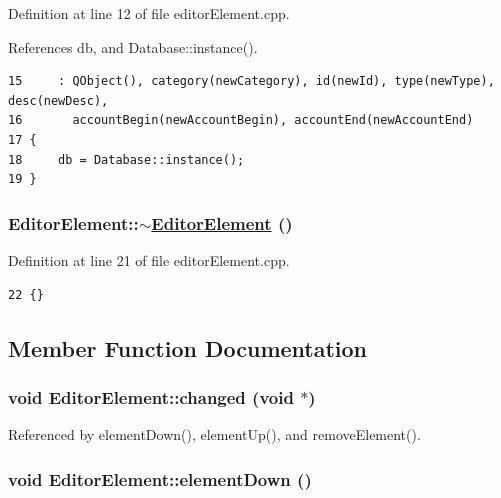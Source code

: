 Definition at line 12 of file editor\-Element.cpp.

References db, and Database::instance().

\footnotesize\begin{verbatim}15     : QObject(), category(newCategory), id(newId), type(newType), desc(newDesc),
16       accountBegin(newAccountBegin), accountEnd(newAccountEnd)
17 {
18     db = Database::instance();
19 }
\end{verbatim}\normalsize 


\hypertarget{classEditorElement_a1}{
\subsubsection[$\sim$EditorElement]{\setlength{\rightskip}{0pt plus 5cm}Editor\-Element::$\sim$\hyperlink{classEditorElement}{Editor\-Element} ()}}
\label{classEditorElement_a1}


Definition at line 21 of file editor\-Element.cpp.

\footnotesize\begin{verbatim}22 {}
\end{verbatim}\normalsize 




\subsection{Member Function Documentation}
\hypertarget{classEditorElement_l0}{
\subsubsection[changed]{\setlength{\rightskip}{0pt plus 5cm}void Editor\-Element::changed (void $\ast$)}}
\label{classEditorElement_l0}




Referenced by element\-Down(), element\-Up(), and remove\-Element().\hypertarget{classEditorElement_k1}{
\subsubsection[elementDown]{\setlength{\rightskip}{0pt plus 5cm}void Editor\-Element::element\-Down ()}}
\label{classEditorElement_k1}


